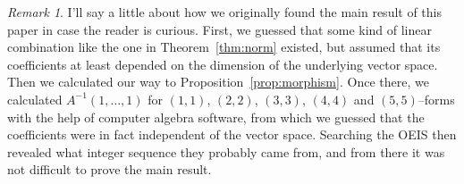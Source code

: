 \documentclass[11pt,a4paper]{amsart}
\theoremstyle{definition}
\theoremstyle{remark}
\newtheorem*{rema}{Remark}
\numberwithin{equation}{section}
\begin{document}
\begin{rema}
I'll say a little about how we originally found the main result of this
paper in case the reader is curious. First, we guessed that some kind of
linear combination like the one in Theorem~\ref{thm:norm} existed, but
assumed that its coefficients at least depended on the dimension of the
underlying vector space. Then we calculated our way to
Proposition~\ref{prop:morphism}. Once there, we calculated
$A^{-1}(1,\ldots,1)$ for $(1,1)$, $(2,2)$, $(3,3)$, $(4,4)$ and
$(5,5)$--forms with the help of computer algebra software, from which we
guessed that the coefficients were in fact independent of the vector space.
Searching the OEIS then revealed what integer sequence they probably came
from, and from there it was not difficult to prove the main result.
\end{rema}
\end{document}
